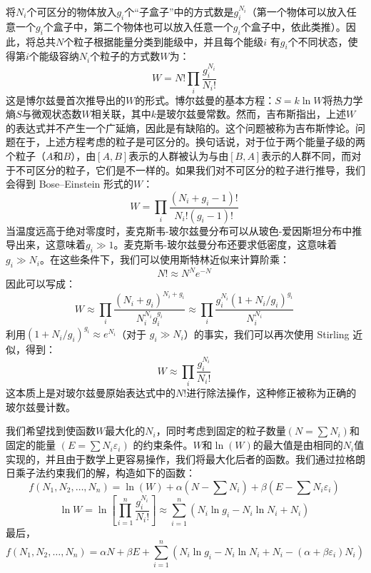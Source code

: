 将\(N_i\)个可区分的物体放入\(g_i\)个“子盒子”中的方式数是\(g_i^{N_i} \)（第一个物体可以放入任意一个\(g_i\)个盒子中，第二个物体也可以放入任意一个\(g_i\)个盒子中，依此类推）。因此，将总共\( N \)个粒子根据能量分类到能级中，并且每个能级\(i\) 有\( g_i\)个不同状态，使得第\(i\)个能级容纳\( N_i \)个粒子的方式数\(W\)为：
\[
W = N! \prod_{i} \frac{g_i^{N_i}}{N_i!}~
\]
这是博尔兹曼首次推导出的\(W\)的形式。博尔兹曼的基本方程：\(S = k \ln W\)将热力学熵\( S \)与微观状态数\( W \)相关联，其中\( k \)是玻尔兹曼常数。然而，吉布斯指出，上述\( W \)的表达式并不产生一个广延熵，因此是有缺陷的。这个问题被称为吉布斯悖论。问题在于，上述方程考虑的粒子是可区分的。换句话说，对于位于两个能量子级的两个粒子（\(A\)和\(B\)），由\([A, B]\)表示的人群被认为与由\([B, A]\)表示的人群不同，而对于不可区分的粒子，它们是不一样的。如果我们对不可区分的粒子进行推导，我们会得到 Bose–Einstein 形式的\(W\)：
\[
W = \prod_{i} \frac{(N_i + g_i - 1)!}{N_i!(g_i - 1)!}~
\]
当温度远高于绝对零度时，麦克斯韦-玻尔兹曼分布可以从玻色-爱因斯坦分布中推导出来，这意味着\( g_i \gg 1 \)。麦克斯韦-玻尔兹曼分布还要求低密度，这意味着\( g_i \gg N_i \)。在这些条件下，我们可以使用斯特林近似来计算阶乘：
\[
N! \approx N^N e^{-N}~
\]
因此可以写成：
\[
W \approx \prod_{i} \frac{(N_i + g_i)^{N_i + g_i}}{N_i^{N_i} g_i^{g_i}} \approx \prod_{i} \frac{g_i^{N_i} (1 + N_i / g_i)^{g_i}}{N_i^{N_i}}~
\]
利用\( (1 + N_i / g_i)^{g_i} \approx e^{N_i} \)（对于 \( g_i \gg N_i \)）的事实，我们可以再次使用 Stirling 近似，得到：
\[
W \approx \prod_{i} \frac{g_i^{N_i}}{N_i!}~
\]
这本质上是对玻尔兹曼原始表达式中的\( N! \)进行除法操作，这种修正被称为正确的玻尔兹曼计数。

我们希望找到使函数\(W\)最大化的\(N_i\)，同时考虑到固定的粒子数量\((N = \sum N_i)\)和固定的能量 \((E = \sum N_i \varepsilon_i)\) 的约束条件。\(W\)和\(\ln(W)\)的最大值是由相同的\(N_i\)值实现的，并且由于数学上更容易操作，我们将最大化后者的函数。我们通过拉格朗日乘子法约束我们的解，构造如下的函数：
\[
f(N_1, N_2, \dots, N_n) = \ln(W) + \alpha (N - \sum N_i) + \beta (E - \sum N_i \varepsilon_i)~
\]
\[
\ln W = \ln \left[\prod_{i=1}^{n} \frac{g_i^{N_i}}{N_i!}\right] \approx \sum_{i=1}^{n} \left(N_i \ln g_i - N_i \ln N_i + N_i \right)~
\]
最后，
\[
f(N_1, N_2, \dots, N_n) = \alpha N + \beta E + \sum_{i=1}^{n} \left( N_i \ln g_i - N_i \ln N_i + N_i - (\alpha + \beta \varepsilon_i) N_i \right)~
\]